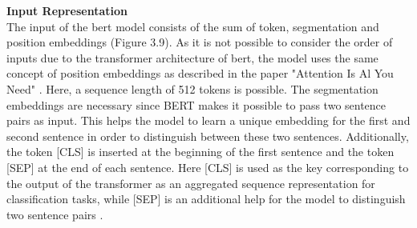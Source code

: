 \documentclass[a4paper, 11pt,titlepage,oneside,openany]{book}
\begin{document}
\noindent \textbf{Input Representation} \\
\noindent The input of the \gls{bert} model consists of the sum of token, segmentation and position embeddings (Figure 3.9). As it is not possible to consider the order of inputs due to the transformer architecture of \gls{bert}, the model uses the same concept of position embeddings as described in the paper "Attention Is Al You Need" \cite{attention}. Here, a sequence length of 512 tokens is possible. The segmentation embeddings are necessary since BERT makes it possible to pass two sentence pairs as input. This helps the model to learn a unique embedding for the first and second sentence in order to distinguish between these two sentences.  Additionally, the token [CLS] is inserted at the beginning of the first sentence and the token [SEP] at the end of each sentence. Here [CLS] is used as the key corresponding to the output of the transformer as an aggregated sequence representation for classification tasks, while [SEP] is an additional help for the model to distinguish two sentence pairs \cite{bert}.\\
\end{document}
